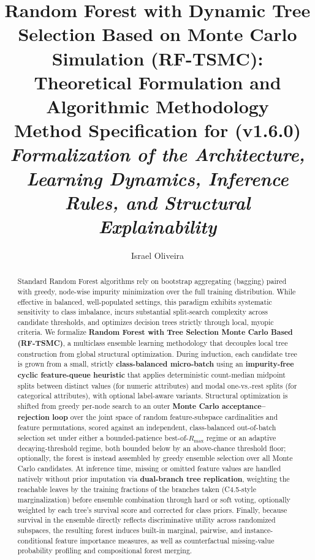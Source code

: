 \documentclass[11pt,a4paper]{article}
\title{%
  \textbf{Random Forest with Dynamic Tree Selection Based on Monte Carlo Simulation (RF-TSMC):}\\[0.35em]
  \large Theoretical Formulation and Algorithmic Methodology\\[0.4em]
  \normalsize\normalfont Method Specification for \href{https://github.com/ysraell/random-forest-mc}{\code{random-forest-mc}} (v1.6.0)\\
  \small\emph{Formalization of the Architecture, Learning Dynamics, Inference Rules, and Structural Explainability}
}
\author{%
  Israel Oliveira\\
  \small\href{mailto:prof.israel@gmail.com}{\code{prof.israel@gmail.com}} \;\textbar\;
  \href{https://github.com/ysraell/random-forest-mc}{\code{github.com/ysraell/random-forest-mc}}
}
\date{}
\begin{document}
\maketitle
\thispagestyle{plain}

\begin{abstract}
\noindent Standard Random Forest algorithms rely on bootstrap aggregating (bagging) paired with greedy, node-wise impurity minimization over the full training distribution. While effective in balanced, well-populated settings, this paradigm exhibits systematic sensitivity to class imbalance, incurs substantial split-search complexity across candidate thresholds, and optimizes decision trees strictly through local, myopic criteria. We formalize \textbf{Random Forest with Tree Selection Monte Carlo Based (RF-TSMC)}, a multiclass ensemble learning methodology that decouples local tree construction from global structural optimization. During induction, each candidate tree is grown from a small, strictly \textbf{class-balanced micro-batch} using an \textbf{impurity-free cyclic feature-queue heuristic} that applies deterministic count-median midpoint splits between distinct values (for numeric attributes) and modal one-vs.-rest splits (for categorical attributes), with optional label-aware variants. Structural optimization is shifted from greedy per-node search to an outer \textbf{Monte Carlo acceptance--rejection loop} over the joint space of random feature-subspace cardinalities and feature permutations, scored against an independent, class-balanced out-of-batch selection set under either a bounded-patience best-of-$R_{\max}$ regime or an adaptive decaying-threshold regime, both bounded below by an above-chance threshold floor; optionally, the forest is instead assembled by greedy ensemble selection over all Monte Carlo candidates. At inference time, missing or omitted feature values are handled natively without prior imputation via \textbf{dual-branch tree replication}, weighting the reachable leaves by the training fractions of the branches taken (C4.5-style marginalization) before ensemble combination through hard or soft voting, optionally weighted by each tree's survival score and corrected for class priors. Finally, because survival in the ensemble directly reflects discriminative utility across randomized subspaces, the resulting forest induces built-in marginal, pairwise, and instance-conditional feature importance measures, as well as counterfactual missing-value probability profiling and compositional forest merging.
\end{abstract}
\end{document}
